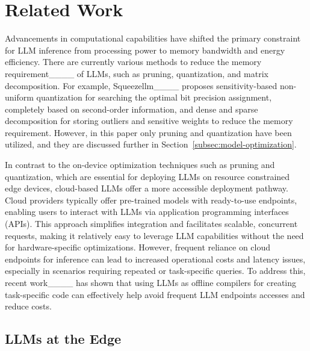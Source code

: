 \section{Related Work}
\label{sec:rw} 

Advancements in computational capabilities have shifted the primary constraint for LLM inference from processing power to memory bandwidth and energy efficiency. 
There are currently various methods to reduce the memory requirement____ of LLMs, such as pruning, quantization, and matrix decomposition. 
For example, Squeezellm____ proposes sensitivity-based non-uniform quantization for searching the optimal bit precision assignment, completely based on second-order information, and dense and sparse decomposition for storing outliers and sensitive weights to reduce the memory requirement.
However, in this paper only pruning and quantization have been utilized, and they are discussed further in Section~\ref{subsec:model-optimization}.

In contrast to the on-device optimization techniques such as pruning and quantization, which are essential for deploying LLMs on resource constrained edge devices, cloud-based LLMs offer a more accessible deployment pathway. Cloud providers typically offer pre-trained models with ready-to-use endpoints, enabling users to interact with LLMs via application programming interfaces (APIs). This approach simplifies integration and facilitates scalable, concurrent requests, making it relatively easy to leverage LLM capabilities without the need for hardware-specific optimizations. 
However, frequent reliance on cloud endpoints for inference can lead to increased operational costs and latency issues, especially in scenarios requiring repeated or task-specific queries. To address this, recent work____ has shown that using LLMs as offline compilers for creating task-specific code can effectively help avoid frequent LLM endpoints accesses and reduce costs. 



\subsection{LLMs at the Edge}

